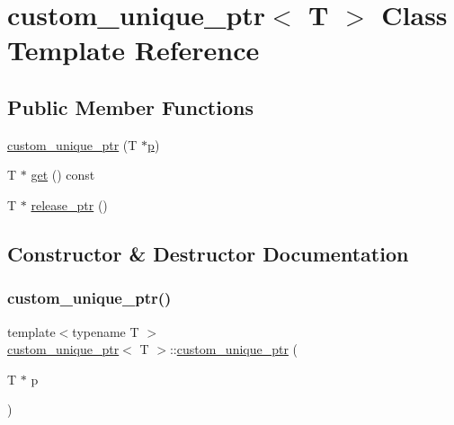 \hypertarget{classcustom__unique__ptr}{}\section{custom\+\_\+unique\+\_\+ptr$<$ T $>$ Class Template Reference}
\label{classcustom__unique__ptr}
\subsection*{Public Member Functions}
\begin{DoxyCompactItemize}
\item 
\mbox{\hyperlink{classcustom__unique__ptr_ae316d4c0716aa703f12e994ef7c60fb1}{custom\+\_\+unique\+\_\+ptr}} (T $\ast$\mbox{\hyperlink{_s_d_l__opengl__glext_8h_aa5367c14d90f462230c2611b81b41d23}{p}})
\item 
T $\ast$ \mbox{\hyperlink{classcustom__unique__ptr_a144002a4e2e04b243b9ac61fbf2d29f2}{get}} () const
\item 
T $\ast$ \mbox{\hyperlink{classcustom__unique__ptr_a1ae319e4cc770addac9d8709447f81bf}{release\+\_\+ptr}} ()
\end{DoxyCompactItemize}


\subsection{Constructor \& Destructor Documentation}
\mbox{\label{classcustom__unique__ptr_ae316d4c0716aa703f12e994ef7c60fb1}} 
\subsubsection{\texorpdfstring{custom\_unique\_ptr()}{custom\_unique\_ptr()}}
{\footnotesize\ttfamily template$<$typename T $>$ \\
\mbox{\hyperlink{classcustom__unique__ptr}{custom\+\_\+unique\+\_\+ptr}}$<$ T $>$\+::\mbox{\hyperlink{classcustom__unique__ptr}{custom\+\_\+unique\+\_\+ptr}} (\begin{DoxyParamCaption}\item[{T $\ast$}]{p }\end{DoxyParamCaption})\hspace{0.3cm}{\ttfamily [inline]}}




